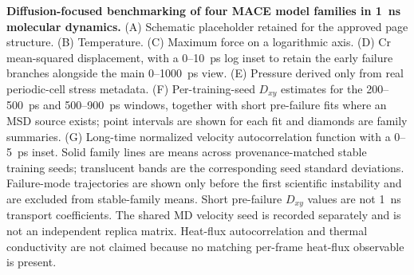 \textbf{Diffusion-focused benchmarking of four MACE model families in 1~ns molecular dynamics.} (A) Schematic placeholder retained for the approved page structure. (B) Temperature. (C) Maximum force on a logarithmic axis. (D) Cr mean-squared displacement, with a 0--10~ps log inset to retain the early failure branches alongside the main 0--1000~ps view. (E) Pressure derived only from real periodic-cell stress metadata. (F) Per-training-seed $D_{xy}$ estimates for the 200--500~ps and 500--900~ps windows, together with short pre-failure fits where an MSD source exists; point intervals are shown for each fit and diamonds are family summaries. (G) Long-time normalized velocity autocorrelation function with a 0--5~ps inset. Solid family lines are means across provenance-matched stable training seeds; translucent bands are the corresponding seed standard deviations. Failure-mode trajectories are shown only before the first scientific instability and are excluded from stable-family means. Short pre-failure $D_{xy}$ values are not 1~ns transport coefficients. The shared MD velocity seed is recorded separately and is not an independent replica matrix. Heat-flux autocorrelation and thermal conductivity are not claimed because no matching per-frame heat-flux observable is present.

